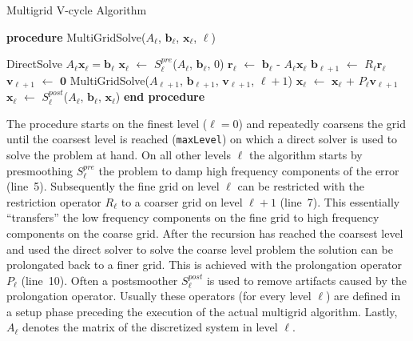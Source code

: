 \documentclass[a4paper,10pt,3p,final,pdftex]{elsarticle}
\begin{document}
\begin{algorithm}
  \caption{Multigrid V-cycle Algorithm} \label{alg:mg_algo}
  \begin{algorithmic}[1]
    \STATE \textbf{procedure} MultiGridSolve($A_\ell$, $\mathbf{b}_\ell$, $\mathbf{x}_\ell$, $\ell$)
    
    \STATE DirectSolve $A_\ell \mathbf{x}_\ell = \mathbf{b}_\ell$
    \ELSE
    \STATE $\mathbf{x}_\ell$ $\leftarrow$ $S^{pre}_\ell$($A_\ell$, $\mathbf{b}_\ell$, $0$) 
    \STATE $\mathbf{r}_\ell$ $\leftarrow$ $\mathbf{b}_\ell$ - $A_\ell
    \mathbf{x}_\ell$ 
    \STATE $\mathbf{b}_{\ell+1}$ $\leftarrow$ $R_\ell \mathbf{r}_\ell$
    \STATE $\mathbf{v}_{\ell+1}$ $\leftarrow$ $\mathbf{0}$
    \STATE MultiGridSolve($A_{\ell+1}$, $\mathbf{b}_{\ell+1}$,
    $\mathbf{v}_{\ell+1}$, $\ell\!+\!1$) 
    \STATE $\mathbf{x}_\ell$ $\leftarrow$ $\mathbf{x}_\ell$ + $P_\ell
    \mathbf{v}_{\ell+1}$  
    \STATE $\mathbf{x}_\ell$ $\leftarrow$ $S^{post}_\ell$($A_\ell$,
    $\mathbf{b}_\ell$, $\mathbf{x}_\ell$) 
    \ENDIF
    \STATE \textbf{end procedure}
  \end{algorithmic}
\end{algorithm}

The procedure starts on the finest level ($\ell\!=\!0$) and repeatedly
coarsens the grid until the coarsest level is reached
(\texttt{maxLevel}) on which a direct solver is used to solve the
problem at hand.  On all other levels $\ell$ the algorithm starts by
presmoothing $S_\ell^{pre}$ the problem to damp high frequency
components of the error (line~5).  Subsequently the fine grid on level
$\ell$ can be restricted with the restriction operator $R_\ell$ to a
coarser grid on level $\ell+ 1$ (line~7).  This essentially
``transfers'' the low frequency components on the fine grid to high
frequency components on the coarse grid.  After the recursion has
reached the coarsest level and used the direct solver to solve the
coarse level problem the solution can be prolongated back to a finer
grid.  This is achieved with the prolongation operator $P_\ell$
(line~10).  Often a postsmoother $S_\ell^{post}$ is used to remove
artifacts caused by the prolongation operator.  Usually these operators
(for every level $\ell$) are defined in a setup phase preceding the
execution of the actual multigrid algorithm.  Lastly, $A_\ell$ denotes
the matrix of the discretized system in level $\ell$. 
\end{document}
